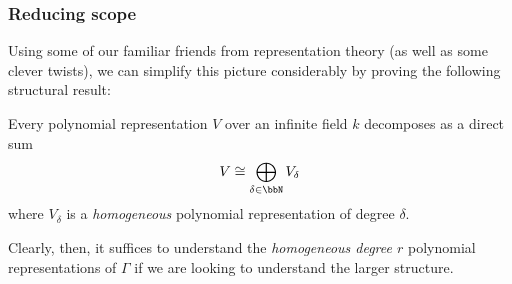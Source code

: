 \documentclass[12pt]{article}
\begin{document}
\subsubsection{Reducing scope}
Using some of our familiar friends from representation theory (as well as some clever twists), 
we can simplify this picture considerably by proving the following structural result:
\begin{thm}\label{thm:decomp}
	Every polynomial representation $V$ over an infinite field $k$ decomposes as a direct sum 
	\[V\cong\bigoplus_{\delta\in\bbN}V_\delta\]
	where $V_\delta$ is a \textit{homogeneous} polynomial representation of degree $\delta.$
\end{thm}
Clearly, then, it suffices to understand the \textit{homogeneous degree $r$} polynomial representations of $\Gamma$ if we are looking
to understand the larger structure.

\brk
\end{document}
